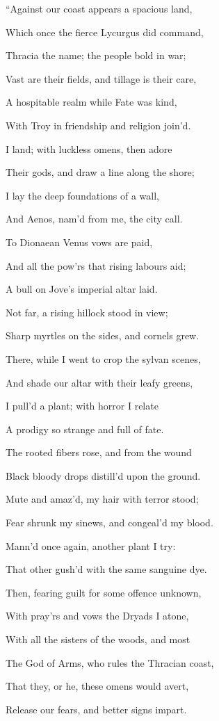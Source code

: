 “Against our coast appears a spacious land,

Which once the fierce Lycurgus did command,

Thracia the name; the people bold in war;

Vast are their fields, and tillage is their care,

A hospitable realm while Fate was kind,

With Troy in friendship and religion join’d.

I land; with luckless omens, then adore

Their gods, and draw a line along the shore;

I lay the deep foundations of a wall,

And Aenos, nam’d from me, the city call.

To Dionaean Venus vows are paid,

And all the pow’rs that rising labours aid;

A bull on Jove’s imperial altar laid.

Not far, a rising hillock stood in view;

Sharp myrtles on the sides, and cornels grew.

There, while I went to crop the sylvan scenes,

And shade our altar with their leafy greens,

I pull’d a plant; with horror I relate

A prodigy so strange and full of fate.

The rooted fibers rose, and from the wound

Black bloody drops distill’d upon the ground.

Mute and amaz’d, my hair with terror stood;

Fear shrunk my sinews, and congeal’d my blood.

Mann’d once again, another plant I try:

That other gush’d with the same sanguine dye.

Then, fearing guilt for some offence unknown,

With pray’rs and vows the Dryads I atone,

With all the sisters of the woods, and most

The God of Arms, who rules the Thracian coast,

That they, or he, these omens would avert,

Release our fears, and better signs impart.

